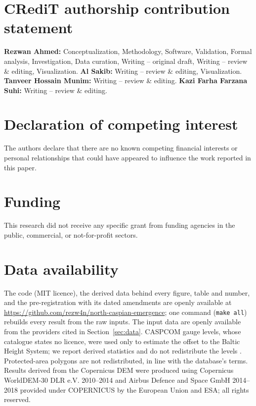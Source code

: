 
\section*{CRediT authorship contribution statement}
\textbf{Rezwan Ahmed:} Conceptualization, Methodology, Software, Validation, Formal analysis, Investigation, Data curation, Writing -- original draft, Writing -- review \& editing, Visualization.
\textbf{Al Sakib:} Writing -- review \& editing, Visualization.
\textbf{Tanveer Hossain Munim:} Writing -- review \& editing.
\textbf{Kazi Farha Farzana Suhi:} Writing -- review \& editing.

\section*{Declaration of competing interest}
The authors declare that there are no known competing financial interests or personal relationships that could have appeared to influence the work reported in this paper.

\section*{Funding}
This research did not receive any specific grant from funding agencies in the public, commercial, or not-for-profit sectors.

\section*{Data availability}
The code (MIT licence), the derived data behind every figure, table and number, and the pre-registration with its dated amendments are openly available at \url{https://github.com/rezw4n/north-caspian-emergence}; one command (\texttt{make all}) rebuilds every result from the raw inputs. The input data are openly available from the providers cited in Section~\ref{sec:data}. CASPCOM gauge levels, whose catalogue states no licence, were used only to estimate the offset to the Baltic Height System; we report derived statistics and do not redistribute the levels \citep{caspcom2026}. Protected-area polygons are not redistributed, in line with the database's terms. Results derived from the Copernicus DEM were produced using Copernicus WorldDEM-30 \textcopyright{} DLR e.V. 2010--2014 and \textcopyright{} Airbus Defence and Space GmbH 2014--2018 provided under COPERNICUS by the European Union and ESA; all rights reserved.

